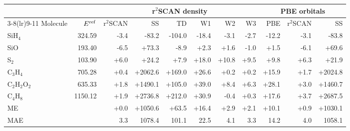 \begin{tabular}{@{}l r rrrrrr rrr@{}}
\toprule
 &  & \multicolumn{6}{c}{r$^2$SCAN density} & \multicolumn{3}{c}{PBE orbitals} \\
\cmidrule(lr){3-8}\cmidrule(lr){9-11}
Molecule & $E^{\rm ref}$ & r$^2$SCAN & SS & TD & W1 & W2 & W3 & PBE & r$^2$SCAN & SS \\
\midrule
SiH$_4$ & 324.59 & \textcolor{pyscfred}{-3.4} & \textcolor{pyscfred}{-83.2} & \textcolor{pyscfred}{-104.0} & \textcolor{pyscfred}{-18.4} & \textcolor{pyscfred}{-3.1} & \textcolor{pyscfred}{-2.7} & \textcolor{pyscfred}{-12.2} & \textcolor{pyscfred}{-3.1} & \textcolor{pyscfred}{-83.8} \\
SiO & 193.40 & \textcolor{pyscfred}{-6.5} & \textcolor{pyscfred}{+73.3} & \textcolor{pyscfred}{-8.9} & \textcolor{pyscfred}{+2.3} & \textcolor{pyscfred}{+1.6} & \textcolor{pyscfred}{-1.0} & \textcolor{pyscfred}{+1.5} & \textcolor{pyscfred}{-6.1} & \textcolor{pyscfred}{+69.6} \\
S$_2$ & 103.90 & \textcolor{pyscfred}{+6.0} & \textcolor{pyscfred}{+24.2} & \textcolor{pyscfred}{+7.9} & \textcolor{pyscfred}{+18.0} & \textcolor{pyscfred}{+10.8} & \textcolor{pyscfred}{+9.5} & \textcolor{pyscfred}{+9.8} & \textcolor{pyscfred}{+6.3} & \textcolor{pyscfred}{+21.9} \\
C$_3$H$_4$ & 705.28 & \textcolor{pyscfred}{+0.4} & \textcolor{pyscfred}{+2062.6} & \textcolor{pyscfred}{+169.0} & \textcolor{pyscfred}{+26.6} & \textcolor{pyscfred}{+0.2} & \textcolor{pyscfred}{+0.2} & \textcolor{pyscfred}{+15.9} & \textcolor{pyscfred}{+1.7} & \textcolor{pyscfred}{+2024.8} \\
C$_2$H$_2$O$_2$ & 635.33 & \textcolor{pyscfred}{+1.8} & \textcolor{pyscfred}{+1490.1} & \textcolor{pyscfred}{+105.0} & \textcolor{pyscfred}{+39.0} & \textcolor{pyscfred}{+8.4} & \textcolor{pyscfred}{+6.3} & \textcolor{pyscfred}{+28.1} & \textcolor{pyscfred}{+3.0} & \textcolor{pyscfred}{+1460.7} \\
C$_4$H$_8$ & 1150.12 & \textcolor{pyscfred}{+1.9} & \textcolor{pyscfred}{+2736.8} & \textcolor{pyscfred}{+212.0} & \textcolor{pyscfred}{+30.9} & \textcolor{pyscfred}{-0.4} & \textcolor{pyscfred}{+0.3} & \textcolor{pyscfred}{+17.6} & \textcolor{pyscfred}{+3.7} & \textcolor{pyscfred}{+2687.5} \\
\midrule
ME & & \textcolor{pyscfred}{+0.0} & \textcolor{pyscfred}{+1050.6} & \textcolor{pyscfred}{+63.5} & \textcolor{pyscfred}{+16.4} & \textcolor{pyscfred}{+2.9} & \textcolor{pyscfred}{+2.1} & \textcolor{pyscfred}{+10.1} & \textcolor{pyscfred}{+0.9} & \textcolor{pyscfred}{+1030.1} \\
MAE & & \textcolor{pyscfred}{3.3} & \textcolor{pyscfred}{1078.4} & \textcolor{pyscfred}{101.1} & \textcolor{pyscfred}{22.5} & \textcolor{pyscfred}{4.1} & \textcolor{pyscfred}{3.3} & \textcolor{pyscfred}{14.2} & \textcolor{pyscfred}{4.0} & \textcolor{pyscfred}{1058.1} \\
\bottomrule
\end{tabular}
